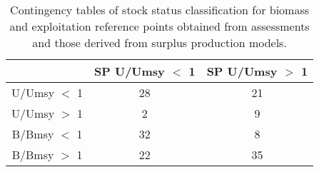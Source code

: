 \begin{table}[ht]
\begin{center}
\begin{tabular}{ccc}
  \hline
 & SP U/Umsy $<$ 1 & SP U/Umsy $>$ 1 \\ 
  \hline
U/Umsy $<$ 1 &  28 &  21 \\ 
  U/Umsy $>$ 1 &   2 &   9 \\ 
  B/Bmsy $<$ 1 &  32 &   8 \\ 
  B/Bmsy $>$ 1 &  22 &  35 \\ 
   \hline
\end{tabular}
\caption{Contingency tables of stock status classification for biomass and exploitation reference points obtained from assessments and those derived from surplus production models.}
\label{tab:contingency}
\end{center}
\end{table}
